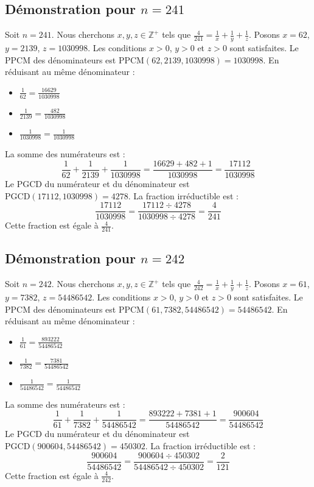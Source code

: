 \documentclass[11pt,a4paper]{article}
\begin{document}
\subsection{Démonstration pour $n = 241$}
Soit $n = 241$. Nous cherchons $x, y, z \in \mathbb{Z}^{+}$ tels que $\frac{4}{241} = \frac{1}{x} + \frac{1}{y} + \frac{1}{z}$.
Posons $x = 62$, $y = 2139$, $z = 1030998$.
Les conditions $x > 0$, $y > 0$ et $z > 0$ sont satisfaites.
Le PPCM des dénominateurs est $\text{PPCM}(62, 2139, 1030998) = 1030998$.
En réduisant au même dénominateur :
\begin{itemize}
    \item $\frac{1}{62} = \frac{16629}{1030998}$
    \item $\frac{1}{2139} = \frac{482}{1030998}$
    \item $\frac{1}{1030998} = \frac{1}{1030998}$
\end{itemize}
La somme des numérateurs est :
$$ \frac{1}{62} + \frac{1}{2139} + \frac{1}{1030998} = \frac{16629 + 482 + 1}{1030998} = \frac{17112}{1030998} $$
Le PGCD du numérateur et du dénominateur est $\text{PGCD}(17112, 1030998) = 4278$.
La fraction irréductible est :
$$ \frac{17112}{1030998} = \frac{17112 \div 4278}{1030998 \div 4278} = \frac{4}{241} $$
Cette fraction est égale à $\frac{4}{241}$.

\subsection{Démonstration pour $n = 242$}
Soit $n = 242$. Nous cherchons $x, y, z \in \mathbb{Z}^{+}$ tels que $\frac{4}{242} = \frac{1}{x} + \frac{1}{y} + \frac{1}{z}$.
Posons $x = 61$, $y = 7382$, $z = 54486542$.
Les conditions $x > 0$, $y > 0$ et $z > 0$ sont satisfaites.
Le PPCM des dénominateurs est $\text{PPCM}(61, 7382, 54486542) = 54486542$.
En réduisant au même dénominateur :
\begin{itemize}
    \item $\frac{1}{61} = \frac{893222}{54486542}$
    \item $\frac{1}{7382} = \frac{7381}{54486542}$
    \item $\frac{1}{54486542} = \frac{1}{54486542}$
\end{itemize}
La somme des numérateurs est :
$$ \frac{1}{61} + \frac{1}{7382} + \frac{1}{54486542} = \frac{893222 + 7381 + 1}{54486542} = \frac{900604}{54486542} $$
Le PGCD du numérateur et du dénominateur est $\text{PGCD}(900604, 54486542) = 450302$.
La fraction irréductible est :
$$ \frac{900604}{54486542} = \frac{900604 \div 450302}{54486542 \div 450302} = \frac{2}{121} $$
Cette fraction est égale à $\frac{4}{242}$.
\end{document}
